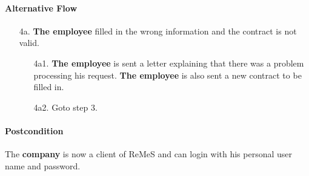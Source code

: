 \paragraph{Alternative Flow}
\begin{enumerate}

	\item[4a.] \textbf{The employee} filled in the wrong information and the contract is not valid. 
	\begin{enumerate}
		\item[4a1.] \textbf{The employee} is sent a letter explaining that there was a problem processing his request.
			\textbf{The employee} is also sent a new contract to be filled in.
		\item[4a2.] Goto step 3. 
	\end{enumerate}
	
\end{enumerate}

\paragraph{Postcondition}
The \textbf{company} is now a client of ReMeS and can login with his personal user name and password.
